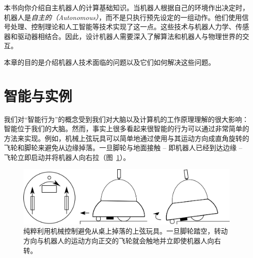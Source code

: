 本书向你介绍自主机器人的计算基础知识。当机器人根据自己的环境作出决定时，机器人是\emph{自主的（Autonomous）}，而不是只执行预先设定的一组动作。他们使用信号处理、控制理论和人工智能等技术实现了这一点。这些技术与机器人力学、传感器和驱动器相结合。因此，设计机器人需要深入了解算法和机器人与物理世界的交互。


本章的目的是介绍机器人技术面临的问题以及它们如何解决这些问题。

\section{智能与实例}

我们对“智能行为”的概念受到我们对大脑以及计算机的工作原理理解的很大影响：智能位于我们的大脑。然而，事实上很多看起来很智能的行为可以通过非常简单的方法来实现。例如，机械上弦玩具可以简单地通过使用与其运动方向成直角旋转的飞轮和脚轮来避免从边缘掉落。一旦脚轮与地面接触 -- 即机器人已经到达边缘 -- 飞轮立即启动并将机器人向右拉（图~\ref{fig:winduptoy}）。

\begin{figure}
	\centering
		\includegraphics[width=\textwidth]{figs/winduptoysketch.png}
	\caption{纯粹利用机械控制避免从桌上掉落的上弦玩具。一旦脚轮踏空，转动方向与机器人的运动方向正交的飞轮就会触地并立即使机器人向右转。}
	\label{fig:winduptoy}
\end{figure}

